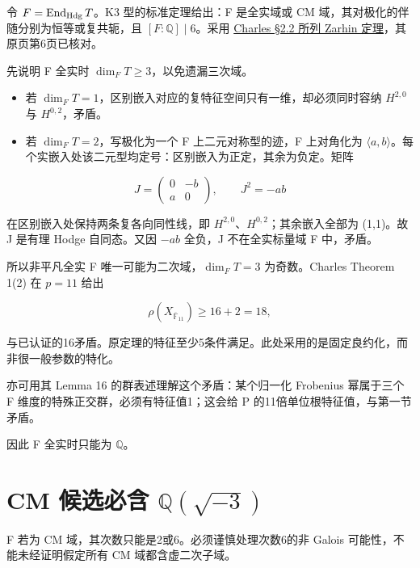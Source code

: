 \documentclass[11pt,a4paper,oneside]{ctexrep}
\theoremstyle{cnplain}
\theoremstyle{definition}
\theoremstyle{remark}
\newcommand{\tightlist}{\setlength{\itemsep}{0pt}\setlength{\parskip}{0pt}}
\begin{document}
令 \(F=\operatorname{End}_{\rm Hdg}T\)。K3 型的标准定理给出：F 是全实域或 CM 域，其对极化的伴随分别为恒等或复共轭，且 \([F:\mathbb Q]\mid6\)。采用 \href{https://www.imo.universite-paris-saclay.fr/~francois.charles/Picard.pdf}{Charles §2.2 所列 Zarhin 定理}，其原页第6页已核对。

先说明 F 全实时 \(\dim_FT\ge3\)，以免遗漏三次域。

\begin{itemize}
\tightlist
\item
  若 \(\dim_FT=1\)，区别嵌入对应的复特征空间只有一维，却必须同时容纳 \(H^{2,0}\) 与 \(H^{0,2}\)，矛盾。
\item
  若 \(\dim_FT=2\)，写极化为一个 F 上二元对称型的迹，F 上对角化为 \(\langle a,b\rangle\)。每个实嵌入处该二元型均定号：区别嵌入为正定，其余为负定。矩阵
\end{itemize}

\begin{equation}
J=\begin{pmatrix}0&-b\\a&0\end{pmatrix},\qquad J^2=-ab
\end{equation}

在区别嵌入处保持两条复各向同性线，即 \(H^{2,0}\)、\(H^{0,2}\)；其余嵌入全部为 (1,1)。故 J 是有理 Hodge 自同态。又因 \(-ab\) 全负，J 不在全实标量域 F 中，矛盾。

所以非平凡全实 F 唯一可能为二次域，\(\dim_FT=3\) 为奇数。Charles Theorem 1(2) 在 \(p=11\) 给出

\begin{equation}
\rho(X_{\overline{\mathbb F}_{11}})\ge16+2=18,
\end{equation}

与已认证的16矛盾。原定理的特征至少5条件满足。此处采用的是固定良约化，而非很一般参数的特化。

亦可用其 Lemma 16 的群表述理解这个矛盾：某个归一化 Frobenius 幂属于三个 F 维度的特殊正交群，必须有特征值1；这会给 P 的11倍单位根特征值，与第一节矛盾。

因此 F 全实时只能为 \(\mathbb Q\)。

\section{\texorpdfstring{CM 候选必含 \(\mathbb Q(\sqrt{-3})\)}{CM 候选必含 \textbackslash mathbb Q(\textbackslash sqrt\{-3\})}}\label{sec:fixed:3}

F 若为 CM 域，其次数只能是2或6。必须谨慎处理次数6的非 Galois 可能性，不能未经证明假定所有 CM 域都含虚二次子域。
\end{document}
